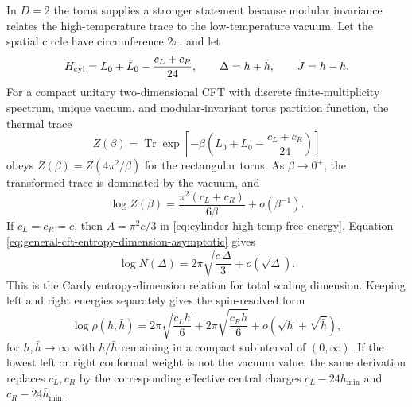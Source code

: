 In \(D=2\) the torus supplies a stronger statement because modular invariance
relates the high-temperature trace to the low-temperature vacuum.  Let the
spatial circle have circumference \(2\pi\), and let
\[
  H_{\rm cyl}=L_0+\bar L_0-\frac{c_L+c_R}{24},
  \qquad
  \Delta=h+\bar h,
  \qquad
  J=h-\bar h .
\]
For a compact unitary two-dimensional CFT with discrete finite-multiplicity
spectrum, unique vacuum, and modular-invariant torus partition function, the
thermal trace
\[
  Z(\beta)
  =
  \operatorname{Tr}
  \exp\left[-\beta\left(L_0+\bar L_0-\frac{c_L+c_R}{24}\right)\right]
\]
obeys \(Z(\beta)=Z(4\pi^2/\beta)\) for the rectangular torus.  As
\(\beta\to0^+\), the transformed trace is dominated by the vacuum, and
\begin{equation}
  \log Z(\beta)
  =
  \frac{\pi^2(c_L+c_R)}{6\beta}
  +o(\beta^{-1}).
  \label{eq:modular-high-temp-cardy}
\end{equation}
If \(c_L=c_R=c\), then \(A=\pi^2c/3\) in
\eqref{eq:cylinder-high-temp-free-energy}.  Equation
\eqref{eq:general-cft-entropy-dimension-asymptotic} gives
\begin{equation}
  \log N(\Delta)
  =
  2\pi\sqrt{\frac{c\,\Delta}{3}}
  +o(\sqrt{\Delta}).
  \label{eq:cardy-total-dimension-asymptotic}
\end{equation}
This is the Cardy entropy-dimension relation for total scaling dimension.
Keeping left and right energies separately gives the spin-resolved form
\begin{equation}
  \log \rho(h,\bar h)
  =
  2\pi\sqrt{\frac{c_L h}{6}}
  +
  2\pi\sqrt{\frac{c_R\bar h}{6}}
  +o(\sqrt h+\sqrt{\bar h}),
  \label{eq:cardy-spin-resolved}
\end{equation}
for \(h,\bar h\to\infty\) with \(h/\bar h\) remaining in a compact subinterval
of \((0,\infty)\).  If the lowest left or right conformal weight is not the
vacuum value, the same derivation replaces \(c_L,c_R\) by the corresponding
effective central charges \(c_L-24h_{\min}\) and
\(c_R-24\bar h_{\min}\).

